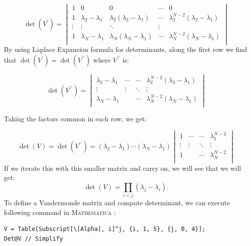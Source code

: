 \documentclass[11pt]{article}
\newcommand{\MA}{\textsc{Mathematica }}
\begin{document}
\begin{equation}
	\det(V^{\prime}) = 
	\begin{vmatrix}
		1 & 0 & 0 & \cdots & 0 \\
		1 & \lambda_2 - \lambda_1 & \lambda_2(\lambda_2 - \lambda_1) & \cdots & \lambda_2^{N-2}(\lambda_2 - \lambda_1) \\ 
		\vdots  & \vdots  & \ddots & \vdots  \\
		1 & \lambda_N - \lambda_1 & \lambda_N(\lambda_N - \lambda_1) & \cdots & \lambda_N^{N-2}(\lambda_N - \lambda_1) \\
	\end{vmatrix}
\end{equation}
By using Laplace Expansion formula for determinants, along the first row we find that $\det(V^{\prime}) = \det(V^{\prime\prime})$ where $V^{\prime\prime}$ is:

\begin{equation}
	\det(V^{\prime\prime}) = 
	\begin{vmatrix}
		 \lambda_2 - \lambda_1 & \cdots & \cdots & \lambda_2^{N-2}(\lambda_2 - \lambda_1) \\ 
		\vdots  & \vdots  & \ddots & \vdots  \\
		\lambda_N - \lambda_1 &  & \cdots &  \lambda_N^{N-2}(\lambda_N - \lambda_1) \\
	\end{vmatrix}
\end{equation}

Taking the factors common in each row, we get:

\begin{equation}
	\det(V) = \det(V^{\prime\prime}) = 
	(\lambda_2 - \lambda_1) \cdots (\lambda_N - \lambda_1)
	\begin{vmatrix}
		1 & \cdots & \cdots & \lambda_2^{N-2} \\ 
		\vdots  & \vdots  & \ddots & \vdots  \\
		1 &  & \cdots &  \lambda_N^{N-2} \\
	\end{vmatrix}
\end{equation}
If we iterate this with this smaller matrix and carry on, we will see that we will get:
\begin{equation}
	\det(V) = \prod_{i<j} (\lambda_j - \lambda_i).
\end{equation}
To define a Vandermonde matrix and compute determinant, we can execute following command in \MA:
\begin{mdframed}[backgroundcolor=magenta!2]
	\begin{footnotesize} 
		\verb"V = Table[Subscript[\[Alpha], i]^j, {i, 1, 5}, {j, 0, 4}];"\\ 
		\verb"Det@V // Simplify"
	\end{footnotesize} 
\end{mdframed}
\end{document}
